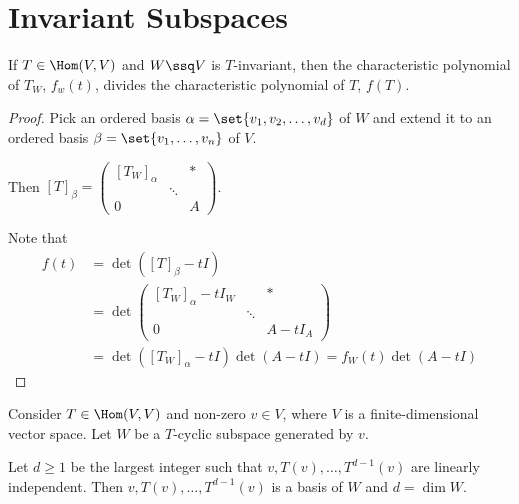 \documentclass[11pt]{scrartcl}
\begin{document}
\section{Invariant Subspaces}
\begin{theorem}
  \label{sec:div}
  If $T\in \Hom(V,V)$ and $W\ssq V$ is $T$-invariant, then the
  characteristic polynomial of $T_{W}$, $f_w(t)$, divides the characteristic
  polynomial of $T$, $f(T)$.
\end{theorem}

\begin{proof}
  Pick an ordered basis $\alpha = \set{v_1, v_2, \dots, v_{d}}$ of $W$
  and extend it to an ordered basis $\beta=\set{v_1, \dots, v_n}$ of
  $V$.

  Then $[T]_{\beta} =
  \begin{pmatrix}
    [T_W]_{\alpha} &        & * \\
                   & \ddots &   \\
    0              &        & A
  \end{pmatrix}$.

  Note that
  \begin{align}
    f(t) &= \det([T]_{\beta} - t I)\\
         &= \det
  \begin{pmatrix}
    [T_W]_{\alpha} - t I_{W} &        & * \\
    & \ddots &   \\
    0              &        & A - t I_{A}
  \end{pmatrix}\\
         &= \det([T_W]_{\alpha} - t I)\det (A-tI) = f_W(t)\det(A-tI)
  \end{align}
                              
\end{proof}

\begin{theorem}
  Consider $T\in\Hom(V,V)$ and non-zero $v\in V$, where $V$ is a
  finite-dimensional vector space. Let $W$ be a $T$-cyclic subspace
  generated by $v$.

  Let $d \geq 1$ be the largest integer such that
  $v, T(v), \dots, T^{d-1}(v)$ are linearly independent. Then
  $v, T(v), \dots, T^{d-1}(v)$ is a basis of $W$ and $d = \dim W$.

\end{theorem}
\end{document}
